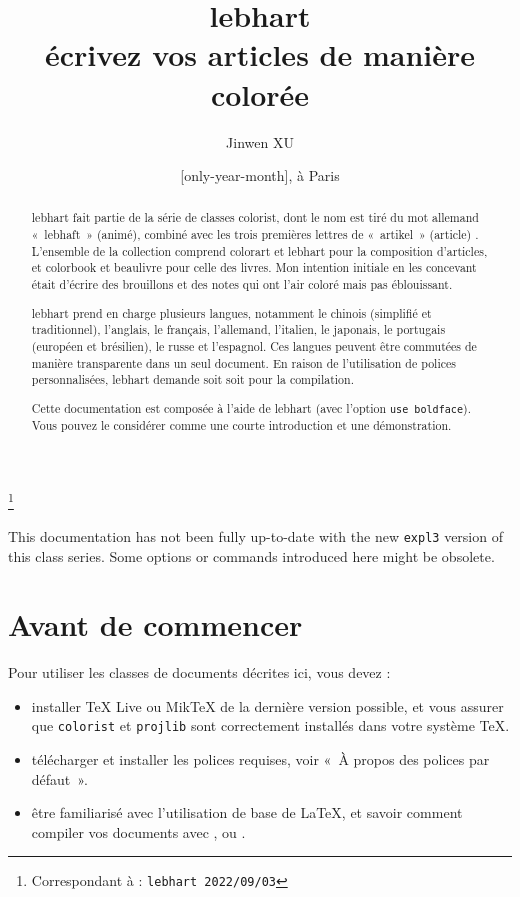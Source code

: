 \documentclass[title in boldface, title in scshape, simple name]{lebhart}
\newcommand{\classoption}[1]{\texttt{\textcolor{code-option}{#1}}}
\newenvironment{tip}[1][Astuce]{%
    \begin{tcolorbox}[breakable,
        enhanced,
        width = \textwidth,
        colback = paper, colbacktitle = paper,
        colframe = gray!50, boxrule=0.2mm,
        coltitle = black,
        fonttitle = \sffamily,
        attach boxed title to top left = {yshift=-\tcboxedtitleheight/2, xshift=.5cm},
        boxed title style = {boxrule=0pt, colframe=paper},
        before skip = 0.3cm,
        after skip = 0.3cm,
        top = 3mm,
        bottom = 3mm,
        title={\scshape\sffamily #1}]%
}{\end{tcolorbox}}
\providecommand{\colorist}{\textsf{colorist}}
\providecommand{\colorart}{\textsf{colorart}}
\providecommand{\colorbook}{\textsf{colorbook}}
\providecommand{\lebhart}{\textsf{lebhart}}
\providecommand{\beaulivre}{\textsf{beaulivre}}
\let\LevelOneTitle\section
\begin{document}
\def\PackageVersion{2022/09/03}

\title{{\normalfont\bfseries\color{main-text}\lebhart{}}\\écrivez vos articles de manière colorée}
\author{Jinwen XU}
\thanks{Correspondant à : \texttt{\lebhart{} \PackageVersion}}
\date{\TheDate{\PackageVersion}[only-year-month], à Paris}

\maketitle

\begin{abstract}
    \lebhart{} fait partie de la série de classes \colorist{}, dont le nom est tiré du mot allemand «~lebhaft~» (animé), combiné avec les trois premières lettres de «~artikel~» (article) . L'ensemble de la collection comprend \colorart{} et \lebhart{} pour la composition d'articles, et \colorbook{} et \beaulivre{} pour celle des livres. Mon intention initiale en les concevant était d'écrire des brouillons et des notes qui ont l'air coloré mais pas éblouissant.

    \lebhart{} prend en charge plusieurs langues, notamment le chinois (simplifié et traditionnel), l'anglais, le français, l'allemand, l'italien, le japonais, le portugais (européen et brésilien), le russe et l'espagnol. Ces langues peuvent être commutées de manière transparente dans un seul document. En raison de l'utilisation de polices personnalisées, \lebhart{} demande soit  soit  pour la compilation.

    Cette documentation est composée à l'aide de \lebhart{} (avec l'option \classoption{use boldface}). Vous pouvez le considérer comme une courte introduction et une démonstration.
\end{abstract}


\begin{tip}
    This documentation has not been fully up-to-date with the new \texttt{expl3} version of this class series. Some options or commands introduced here might be obsolete.
\end{tip}

\setcounter{tocdepth}{2}
\tableofcontents


\LevelOneTitle*{Avant de commencer}

Pour utiliser les classes de documents décrites ici, vous devez :
\begin{itemize}
      \item installer TeX Live ou MikTeX de la dernière version possible, et vous assurer que \texttt{colorist} et \texttt{projlib} sont correctement installés dans votre système \TeX{}.
      \item télécharger et installer les polices requises, voir «~À propos des polices par défaut~».
      \item être familiarisé avec l'utilisation de base de \LaTeX{}, et savoir comment compiler vos documents avec ,  ou .
\end{itemize}
\end{document}
